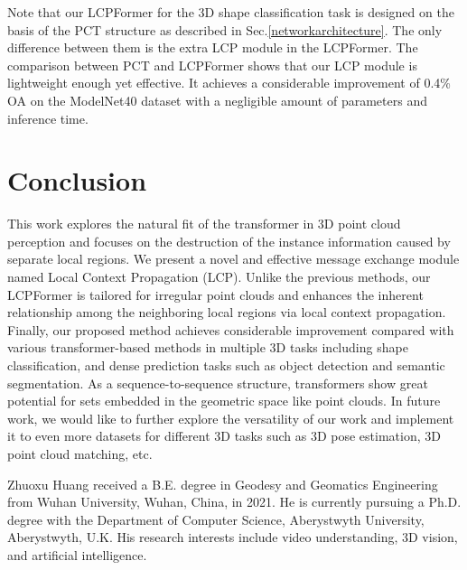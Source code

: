 \documentclass[lettersize,journal]{IEEEtran}
\begin{document}
Note that our LCPFormer for the 3D shape classification task is designed on the basis of the PCT \cite{guo2021pct} structure as described in Sec.\ref{networkarchitecture}. The only difference between them is the extra LCP module in the LCPFormer. The comparison between PCT \cite{guo2021pct} and LCPFormer shows that our LCP module is lightweight enough yet effective. It achieves a considerable improvement of 0.4\% OA on the ModelNet40 dataset with a negligible amount of parameters and inference time.




\section{Conclusion}

This work explores the natural fit of the transformer in 3D point cloud perception and focuses on the destruction of the instance information caused by separate local regions. We present a novel and effective message exchange module named Local Context Propagation (LCP). Unlike the previous methods, our LCPFormer is tailored for irregular point clouds and enhances the inherent relationship among the neighboring local regions via local context propagation. Finally, our proposed method achieves considerable improvement compared with various transformer-based methods in multiple 3D tasks including shape classification, and dense prediction tasks such as object detection and semantic segmentation. As a sequence-to-sequence structure, transformers show great potential for sets embedded in the geometric space like point clouds. In future work, we would like to further explore the versatility of our work and implement it to even more datasets for different 3D tasks such as 3D pose estimation, 3D point cloud matching, etc.










\vspace{11pt}

\begin{IEEEbiographynophoto}{Zhuoxu Huang}
received a B.E. degree in Geodesy and Geomatics Engineering from Wuhan University, Wuhan, China, in 2021. He is currently pursuing a Ph.D. degree with the Department of Computer Science, Aberystwyth University, Aberystwyth, U.K. His research interests include video understanding, 3D vision, and artificial intelligence.
\end{IEEEbiographynophoto}
\end{document}
